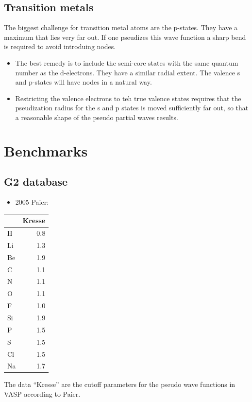 \documentclass[11pt,a4paper]{report}
\begin{document}
\subsection{Transition metals}
The biggest challenge for transition metal atoms are the
p-states. They have a maximum that lies very far out. If one pseudizes
this wave function a sharp bend is required to avoid introduing nodes.
\begin{itemize}
\item The best remedy is to include the semi-core states with the same
  quantum number as the d-electrons. They have a similar radial
  extent. The valence s and p-states will have nodes in a natural way.
%
\item Restricting the valence electrons to teh true valence states
  requires that the pseudization radius for the s and p states is
  moved sufficiently far out, so that a reasonable shape of the pseudo
  partial waves results.
\end{itemize}

\section{Benchmarks}
\subsection{G2 database}


\begin{itemize}
\item 2005 Paier\cite{paier05_jcp122_234102}: 
\end{itemize}


\begin{center}
\begin{tabular}{|l|r|}
\hline
& Kresse \\
\hline
H  & 0.8 \\
Li & 1.3 \\
Be & 1.9 \\
C  & 1.1 \\
N  & 1.1 \\
O  & 1.1 \\
F  & 1.0 \\
Si & 1.9 \\
P  & 1.5 \\
S  & 1.5 \\
Cl & 1.5 \\
Na & 1.7 \\
\hline
\end{tabular}
\end{center}
The data ``Kresse'' are the cutoff parameters for the pseudo wave
functions in VASP according to Paier\cite{paier05_jcp122_234102}.
\end{document}
